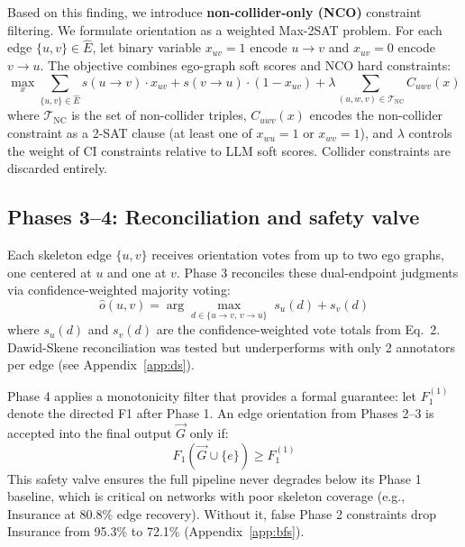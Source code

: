 \documentclass{article} %
\begin{document}
Based on this finding, we introduce \textbf{non-collider-only (NCO)} constraint filtering. We formulate orientation as a weighted Max-2SAT problem. For each edge $\{u,v\} \in \hat{E}$, let binary variable $x_{uv} = 1$ encode $u \to v$ and $x_{uv} = 0$ encode $v \to u$. The objective combines ego-graph soft scores and NCO hard constraints:
\begin{equation}
    \max_{x} \sum_{\{u,v\} \in \hat{E}} s(u \to v) \cdot x_{uv} + s(v \to u) \cdot (1 - x_{uv}) + \lambda \sum_{(u,w,v) \in \mathcal{T}_{\text{NC}}} C_{uwv}(x)
\label{eq:maxsat}
\end{equation}
where $\mathcal{T}_{\text{NC}}$ is the set of non-collider triples, $C_{uwv}(x)$ encodes the non-collider constraint as a 2-SAT clause (at least one of $x_{wu} = 1$ or $x_{wv} = 1$), and $\lambda$ controls the weight of CI constraints relative to LLM soft scores. Collider constraints are discarded entirely.

\subsection{Phases 3--4: Reconciliation and safety valve}

Each skeleton edge $\{u, v\}$ receives orientation votes from up to two ego graphs, one centered at $u$ and one at $v$. Phase 3 reconciles these dual-endpoint judgments via confidence-weighted majority voting:
\begin{equation}
    \hat{o}(u,v) = \arg\max_{d \in \{u \to v, \, v \to u\}} \; s_u(d) + s_v(d)
\end{equation}
where $s_u(d)$ and $s_v(d)$ are the confidence-weighted vote totals from Eq.~2. Dawid-Skene reconciliation \citep{dawid1979maximum} was tested but underperforms with only 2 annotators per edge (see Appendix~\ref{app:ds}).

Phase 4 applies a monotonicity filter that provides a formal guarantee: let $F_1^{(1)}$ denote the directed F1 after Phase 1. An edge orientation from Phases 2--3 is accepted into the final output $\vec{G}$ only if:
\begin{equation}
    F_1(\vec{G} \cup \{e\}) \geq F_1^{(1)}
\end{equation}
This safety valve ensures the full pipeline never degrades below its Phase 1 baseline, which is critical on networks with poor skeleton coverage (e.g., Insurance at 80.8\% edge recovery). Without it, false Phase 2 constraints drop Insurance from 95.3\% to 72.1\% (Appendix~\ref{app:bfs}).
\end{document}
